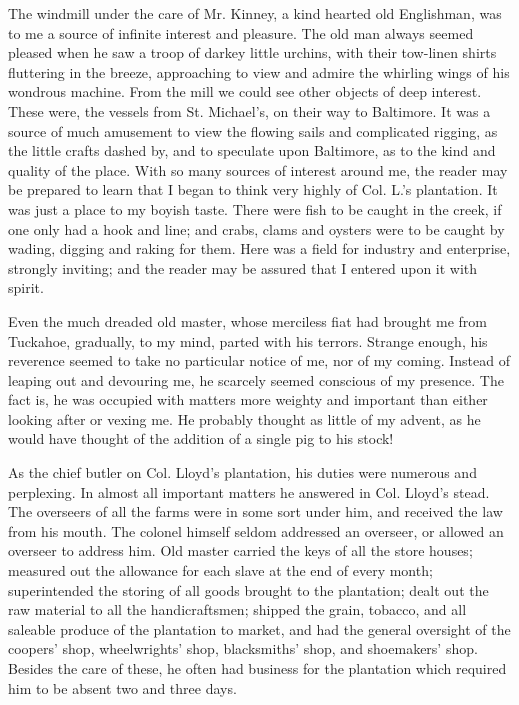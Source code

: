 The windmill under the care of Mr. Kinney, a kind hearted old
Englishman, was to me a source of infinite interest and pleasure. The
old man always seemed pleased when he saw a troop of darkey little
urchins, with their tow-linen shirts fluttering in the breeze,
approaching to view and admire the whirling wings of his wondrous
machine. From the mill we could see other objects of deep interest.
These were, {}the vessels from St. Michael's, on their way to Baltimore.
It was a source of much amusement to view the flowing sails and
complicated rigging, as the little crafts dashed by, and to speculate
upon Baltimore, as to the kind and quality of the place. With so many
sources of interest around me, the reader may be prepared to learn that
I began to think very highly of Col. L.'s plantation. It was just a
place to my boyish taste. There were fish to be caught in the creek, if
one only had a hook and line; and crabs, clams and oysters were to be
caught by wading, digging and raking for them. Here was a field for
industry and enterprise, strongly inviting; and the reader may be
assured that I entered upon it with spirit.

Even the much dreaded old master, whose merciless fiat had brought me
from Tuckahoe, gradually, to my mind, parted with his terrors. Strange
enough, his reverence seemed to take no particular notice of me, nor of
my coming. Instead of leaping out and devouring me, he scarcely seemed
conscious of my presence. The fact is, he was occupied with matters more
weighty and important than either looking after or vexing me. He
probably thought as little of my advent, as he would have thought of the
addition of a single pig to his stock!

As the chief butler on Col. Lloyd's plantation, his duties were numerous
and perplexing. In almost all important matters he answered in Col.
Lloyd's stead. The overseers of all the farms were in some sort under
him, and received the law from his mouth. The colonel himself seldom
addressed an overseer, or {}allowed an overseer to address him. Old
master carried the keys of all the store houses; measured out the
allowance for each slave at the end of every month; superintended the
storing of all goods brought to the plantation; dealt out the raw
material to all the handicraftsmen; shipped the grain, tobacco, and all
saleable produce of the plantation to market, and had the general
oversight of the coopers' shop, wheelwrights' shop, blacksmiths' shop,
and shoemakers' shop. Besides the care of these, he often had business
for the plantation which required him to be absent two and three days.

